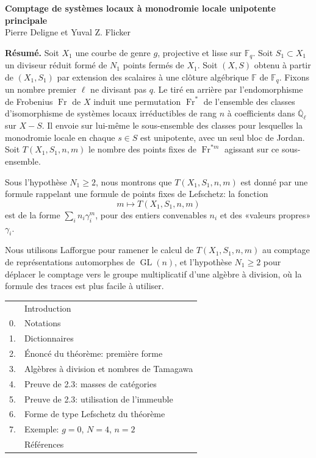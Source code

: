\documentclass[10pt]{article}
\newcommand{\Fq}{\mathbb F_q}
\newcommand{\Fb}{\mathbb F}
\newcommand{\Ql}{\overline{\mathbb Q}_{\ell}}
\newcommand{\GL}{\operatorname{GL}}
\newcommand{\Fr}{\operatorname{Fr}}
\theoremstyle{deligne}
\begin{document}
\begin{center}
{\Large\bfseries Comptage de systèmes locaux à monodromie locale unipotente principale}\\[0.35em]
{\large Pierre Deligne et Yuval Z. Flicker}
\end{center}

\textbf{Résumé.} Soit $X_1$ une courbe de genre $g$, projective et lisse sur $\Fq$. Soit $S_1\subset X_1$ un diviseur réduit formé de $N_1$ points fermés de $X_1$. Soit $(X,S)$ obtenu à partir de $(X_1,S_1)$ par extension des scalaires à une clôture algébrique $\Fb$ de $\Fq$. Fixons un nombre premier $\ell$ ne divisant pas $q$. Le tiré en arrière par l'endomorphisme de Frobenius $\Fr$ de $X$ induit une permutation $\Fr^*$ de l'ensemble des classes d'isomorphisme de systèmes locaux irréductibles de rang $n$ à coefficients dans $\Ql$ sur $X-S$. Il envoie sur lui-même le sous-ensemble des classes pour lesquelles la monodromie locale en chaque $s\in S$ est unipotente, avec un seul bloc de Jordan. Soit $T(X_1,S_1,n,m)$ le nombre des points fixes de $\Fr^{*m}$ agissant sur ce sous-ensemble.

Sous l'hypothèse $N_1\ge2$, nous montrons que $T(X_1,S_1,n,m)$ est donné par une formule rappelant une formule de points fixes de Lefschetz: la fonction
\[
 m\longmapsto T(X_1,S_1,n,m)
\]
est de la forme $\sum_i n_i\gamma_i^m$, pour des entiers convenables $n_i$ et des «valeurs propres» $\gamma_i$.

Nous utilisons Lafforgue pour ramener le calcul de $T(X_1,S_1,n,m)$ au comptage de représentations automorphes de $\GL(n)$, et l'hypothèse $N_1\ge2$ pour déplacer le comptage vers le groupe multiplicatif d'une algèbre à division, où la formule des traces est plus facile à utiliser.

\begin{center}
\begin{tabular}{rl}
& Introduction\\
0. & Notations\\
1. & Dictionnaires\\
2. & Énoncé du théorème: première forme\\
3. & Algèbres à division et nombres de Tamagawa\\
4. & Preuve de 2.3: masses de catégories\\
5. & Preuve de 2.3: utilisation de l'immeuble\\
6. & Forme de type Lefschetz du théorème\\
7. & Exemple: $g=0$, $N=4$, $n=2$\\
& Références
\end{tabular}
\end{center}
\end{document}
